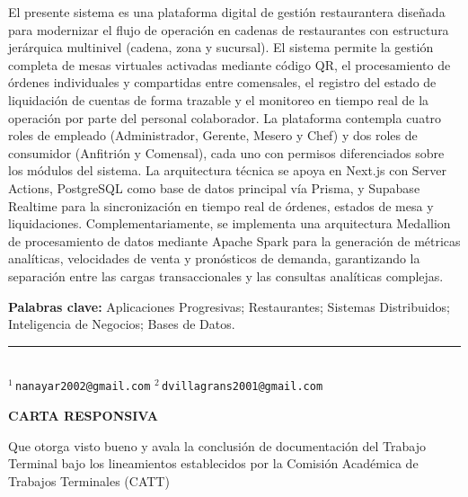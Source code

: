 \vspace{0.3cm}
\noindent El presente sistema es una plataforma digital de gesti\'on restaurantera dise\~nada para
modernizar el flujo de operaci\'on en cadenas de restaurantes con estructura jer\'arquica
multinivel (cadena, zona y sucursal). El sistema permite la gesti\'on completa de mesas
virtuales activadas mediante c\'odigo QR, el procesamiento de \'ordenes individuales y
compartidas entre comensales, el registro del estado de liquidaci\'on de cuentas de forma
trazable y el monitoreo en tiempo real de la operaci\'on por parte del personal colaborador.
La plataforma contempla cuatro roles de empleado (Administrador, Gerente, Mesero y Chef)
y dos roles de consumidor (Anfitri\'on y Comensal), cada uno con permisos diferenciados
sobre los m\'odulos del sistema. La arquitectura t\'ecnica se apoya en Next.js con Server
Actions, PostgreSQL como base de datos principal v\'ia Prisma, y Supabase Realtime para
la sincronizaci\'on en tiempo real de \'ordenes, estados de mesa y liquidaciones.
Complementariamente, se implementa una arquitectura Medallion de procesamiento de datos
mediante Apache Spark para la generaci\'on de m\'etricas anal\'iticas, velocidades de venta
y pron\'osticos de demanda, garantizando la separaci\'on entre las cargas transaccionales
y las consultas anal\'iticas complejas.

\vspace{0.3cm}
\noindent\textbf{Palabras clave:} Aplicaciones Progresivas; Restaurantes;
Sistemas Distribuidos; Inteligencia de Negocios; Bases de Datos.

\vfill
\noindent\rule{\linewidth}{0.4pt}\\[0.15cm]
{\fontsize{9}{11}\selectfont
$^{1}$\,\texttt{nanayar2002@gmail.com}\quad
$^{2}$\,\texttt{dvillagrans2001@gmail.com}}

\newpage
\thispagestyle{empty}
\begin{center}
  {\normalsize\bfseries CARTA RESPONSIVA\par}
  \vspace{0.2cm}
  {\small Que otorga visto bueno y avala la conclusi\'on de documentaci\'on del Trabajo
  Terminal bajo los lineamientos establecidos por la Comisi\'on Acad\'emica de Trabajos
  Terminales (CATT)\par}
\end{center}

